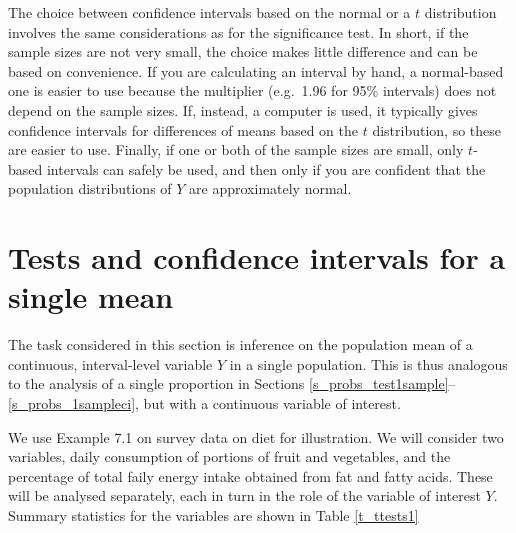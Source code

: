 The choice between confidence intervals based on the normal or a $t$
distribution involves the same considerations
as for the significance test.
In short, if the sample sizes are not very
small, the choice makes little difference and can be based on
convenience. If you are calculating an interval by hand, a normal-based
one is easier to use because the multiplier (e.g.\ 1.96 for 95\%
intervals) does not depend on the sample sizes. If, instead,
a computer is used, it typically gives confidence intervals for differences
of means based on the $t$ distribution, so these are easier to use.
Finally, if one or both of the sample sizes are small, only $t$-based
intervals can safely be used, and then only if you are confident that
the population distributions of $Y$  are approximately normal.


\section{Tests and confidence intervals for a single
mean}
\label{s_means_1sample}

The task considered in this section is inference on the population mean
of a continuous, interval-level variable $Y$ in a single population.
This is thus analogous to the analysis of a single proportion in
Sections \ref{s_probs_test1sample}--\ref{s_probs_1sampleci}, but with a
continuous variable of interest.

We use Example 7.1 on survey data on diet for illustration. We will
consider two variables, daily consumption of portions of fruit and
vegetables, and the percentage of total faily energy intake obtained
from fat and fatty acids. These will be analysed separately, each in
turn in the role of the variable of interest $Y$. Summary statistics for
the variables are shown in Table \ref{t_ttests1}

